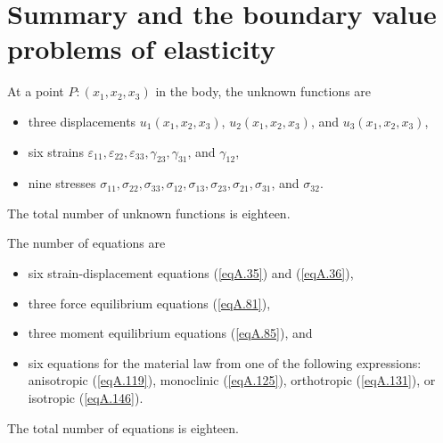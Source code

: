 \documentclass{AeroStructure-ERJohnson}
\begin{document}
\pagebreak

\section{Summary and the boundary value problems of elasticity}\label{secA.4}

At a point $P{:}(x_{1}, x_{2}, x_{3})$ in the body, the unknown functions are
\begin{itemize}
\item three displacements $u_{1}(x_{1}, x_{2}, x_{3})$, $u_{2}(x_{1}, x_{2}, x_{3})$, and $u_{3}(x_{1}, x_{2}, x_{3})$,

\item six strains $\varepsilon_{11}, \varepsilon_{22}, \varepsilon_{33}, \gamma_{23}, \gamma_{31}$, and $\gamma_{12}$,

\item nine stresses $\sigma_{11}, \sigma_{22}, \sigma_{33}, \sigma_{12}, \sigma_{13}, \sigma_{23}, \sigma_{21}, \sigma_{31}$, and $\sigma_{32}$.
\end{itemize}
The total number of unknown functions is eighteen.

The number of equations are
\begin{itemize}
\item six strain-displacement equations (\ref{eqA.35}) and (\ref{eqA.36}),

\item three force equilibrium equations (\ref{eqA.81}),

\item three moment equilibrium equations (\ref{eqA.85}), and

\item six equations for the material law from one of the following expressions: anisotropic (\ref{eqA.119}), monoclinic (\ref{eqA.125}), orthotropic (\ref{eqA.131}), or isotropic (\ref{eqA.146}).
\end{itemize}
The total number of equations is eighteen.
\end{document}
